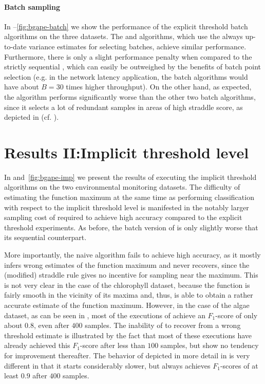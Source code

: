 \paragraph{Batch sampling}
In --\ref{fig:bgape-batch} we show the performance
of the explicit threshold batch algorithms on the three datasets. The \bacl
and \bstr algorithms,
which use the always up-to-date variance estimates for selecting batches,
achieve similar performance. Furthermore, there is only a slight performance
penalty when compared to the strictly sequential \str, which can easily be
outweighed by the benefits of batch point selection (e.g. in the network
latency application, the batch algorithms would have about $B = 30$ times
higher throughput). On the other hand, as expected, the \rstr algorithm
performs significantly worse than the other two batch algorithms, since it
selects a lot of redundant samples in areas of high straddle score, as depicted
in  (cf. ).

\section{Results II:\hspace{0.33em}Implicit threshold level}
In  and~\ref{fig:bgape-imp} we present the results of
executing the implicit threshold algorithms on the two
environmental monitoring datasets. The difficulty of estimating the
function maximum at the same time as performing classification with respect to
the implicit threshold level is manifested in the notably larger sampling cost
of \iacl required to achieve high accuracy compared to the explicit threshold
experiments. As before, the batch version of
\iacl is only slightly worse that its sequential counterpart.

More importantly, the naive \istr algorithm
fails to achieve high accuracy, as it mostly infers wrong estimates of
the function maximum and never recovers, since the (modified) straddle rule
gives no incentive for sampling near the maximum.
This is not very clear in the case of the chlorophyll dataset, because
the function is fairly smooth in the vicinity of its maxima and, thus,
\istr is able to obtain a rather accurate estimate of the function
maximum.
However, in the case of the algae dataset,
as can be seen in , most
of the executions of \istr achieve an $F_1$-score of only about
0.8, even after $400$ samples. The inability of \istr to recover from a wrong
threshold estimate is illustrated by the fact that most of these executions
have already achieved this $F_1$-score after less than $100$ samples, but show
no tendency for improvement thereafter. The behavior of \iacl depicted in
more detail in  is very different
in that it starts considerably slower, but always achieves $F_1$-scores of
at least $0.9$ after $400$ samples.

